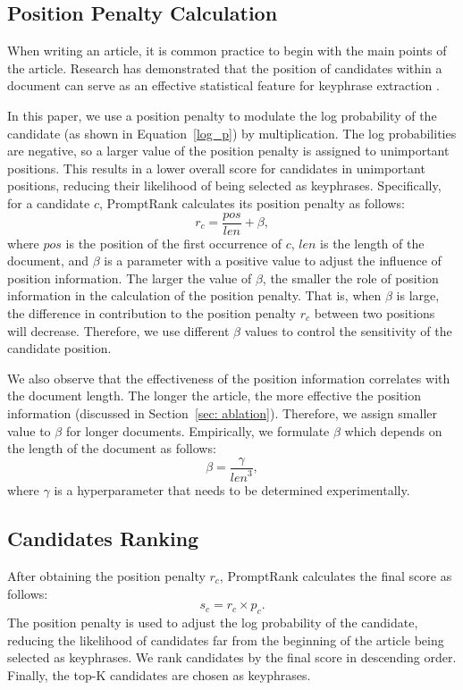 \documentclass[11pt]{article}
\begin{document}
\subsection{Position Penalty Calculation}
\label{sec: pos}

When writing an article, it is common practice to begin with the main points of the article.
Research has demonstrated that the position of candidates within a document can serve as an effective statistical feature for keyphrase extraction \cite{florescu-caragea-2017-positionrank, bennani-smires-etal-2018-simple, 8954611}. 

In this paper, we use a position penalty to modulate the log probability of the candidate (as shown in Equation~\ref{log_p}) by multiplication. The log probabilities are negative, so a larger value of the position penalty is assigned to unimportant positions. This results in a lower overall score for candidates in unimportant positions, reducing their likelihood of being selected as keyphrases. Specifically, for a candidate $c$, PromptRank calculates its position penalty as follows:
\begin{equation} 
r_{c}=\frac{pos}{ { len }}+\beta,
\label{eq_pos_penalty}
\end{equation} 
where $pos$ is the position of the first occurrence of $c$, $len$ is the length of the document, and $\beta$ is a parameter with a positive value to adjust the influence of position information. The larger the value of $\beta$, the smaller the role of position information in the calculation of the position penalty. That is, when $\beta$ is large, the difference in contribution to the position penalty $r_c$ between two positions will decrease. Therefore, we use different $\beta$ values to control the sensitivity of the candidate position. 

We also observe that the effectiveness of the position information correlates with the document length. The longer the article, the more effective the position information (discussed in Section~\ref{sec: ablation}). Therefore, we assign smaller value to $\beta$ for longer documents. Empirically, we formulate $\beta$ which depends on the length of the document as follows: 
\begin{equation}
\beta=\frac{\gamma}{{len}^{3}},
\label{eq_beta}
\end{equation}
where $\gamma$ is a hyperparameter that needs to be determined experimentally. 



\subsection{Candidates Ranking}
After obtaining the position penalty $r_{c}$,  PromptRank calculates the final score as follows:
\begin{equation}
{ s_{c} }=r_{c} \times  { p_{c}}.
\end{equation}
The position penalty is used to adjust the log probability of the candidate, reducing the likelihood of candidates far from the beginning of the article being selected as keyphrases. We rank candidates by the final score in descending order. Finally, the top-K candidates are chosen as keyphrases. 
\end{document}
